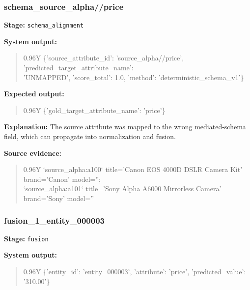 \documentclass[10pt]{article}
\begin{document}
\subsubsection*{schema\_source\_alpha//price}
\textbf{Stage:} \texttt{schema\_alignment}

\textbf{System output:}
\begin{quote}
\footnotesize\ttfamily
\begin{tabularx}{0.96\linewidth}{Y}
\{'source\_attribute\_id': 'source\_alpha//price', 'predicted\_target\_attribute\_name': \\ 'UNMAPPED', 'score\_total': 1.0, 'method': 'deterministic\_schema\_v1'\}
\end{tabularx}
\end{quote}

\textbf{Expected output:}
\begin{quote}
\footnotesize\ttfamily
\begin{tabularx}{0.96\linewidth}{Y}
\{'gold\_target\_attribute\_name': 'price'\}
\end{tabularx}
\end{quote}

\textbf{Explanation:} The source attribute was mapped to the wrong mediated-schema field, which can propagate into normalization and fusion.

\textbf{Source evidence:}
\begin{quote}
\footnotesize\ttfamily
\begin{tabularx}{0.96\linewidth}{Y}
`source\_alpha:a100` title='Canon EOS 4000D DSLR Camera Kit' brand='Canon' model=''; \\ `source\_alpha:a101` title='Sony Alpha A6000 Mirrorless Camera' brand='Sony' model=''
\end{tabularx}
\end{quote}

\subsubsection*{fusion\_1\_entity\_000003}
\textbf{Stage:} \texttt{fusion}

\textbf{System output:}
\begin{quote}
\footnotesize\ttfamily
\begin{tabularx}{0.96\linewidth}{Y}
\{'entity\_id': 'entity\_000003', 'attribute': 'price', 'predicted\_value': '310.00'\}
\end{tabularx}
\end{quote}
\end{document}
